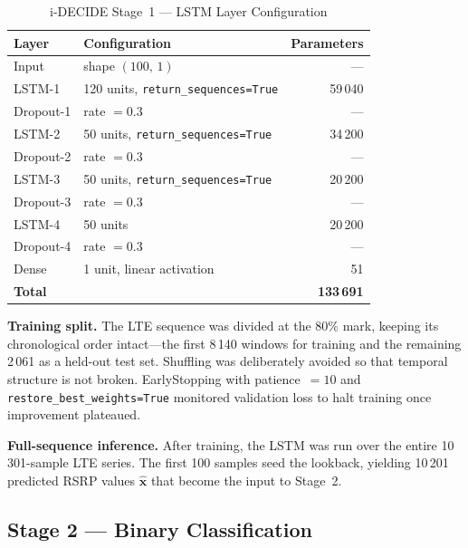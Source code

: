 \documentclass[journal]{IEEEtran}
\begin{document}
\begin{table}[!t]
\caption{i-DECIDE Stage~1 --- LSTM Layer Configuration}
\label{tab:lstm}
\centering
\begin{tabular}{llr}
\toprule
\textbf{Layer} & \textbf{Configuration} & \textbf{Parameters} \\
\midrule
Input      & shape $(100,\,1)$                           & ---     \\
LSTM-1     & 120 units, \texttt{return\_sequences=True}  & 59\,040 \\
Dropout-1  & rate $= 0.3$                                & ---     \\
LSTM-2     & 50 units, \texttt{return\_sequences=True}   & 34\,200 \\
Dropout-2  & rate $= 0.3$                                & ---     \\
LSTM-3     & 50 units, \texttt{return\_sequences=True}   & 20\,200 \\
Dropout-3  & rate $= 0.3$                                & ---     \\
LSTM-4     & 50 units                                    & 20\,200 \\
Dropout-4  & rate $= 0.3$                                & ---     \\
Dense      & 1 unit, linear activation                   & 51      \\
\midrule
\textbf{Total} &                                         & \textbf{133\,691} \\
\bottomrule
\end{tabular}
\end{table}

\textbf{Training split.}
The LTE sequence was divided at the 80\% mark, keeping its chronological
order intact---the first 8\,140 windows for training and the remaining
2\,061 as a held-out test set. Shuffling was deliberately avoided so
that temporal structure is not broken. EarlyStopping with
patience~$=10$ and \texttt{restore\_best\_weights=True} monitored
validation loss to halt training once improvement plateaued.

\textbf{Full-sequence inference.}
After training, the LSTM was run over the entire 10\,301-sample LTE
series. The first 100 samples seed the lookback, yielding 10\,201
predicted RSRP values $\hat{\mathbf{x}}$ that become the input to
Stage~2.

\subsection{Stage 2 --- Binary Classification}
\end{document}
